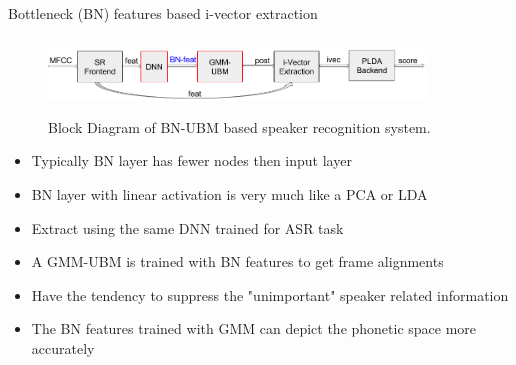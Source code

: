 \documentclass{beamer}
\begin{document}
\begin{frame}{Bottleneck (BN) features based i-vector extraction}
\begin{figure}
      \centering
      \includegraphics[width=10cm, height=2cm]{figures/BN_ivec_blockdiagram.png}
      \vspace{-4pt}
      \caption{Block Diagram of BN-UBM based speaker recognition system.}
      \label{fig:bn_ivec}
  \end{figure}
  \vspace{-15pt}
\begin{itemize}
    \item Typically BN layer has fewer nodes then input layer
    \item BN layer with linear activation is very much like a PCA or LDA
    \item Extract using the same DNN trained for ASR task
    \item A GMM-UBM is trained with BN features to get frame alignments
    \item Have the tendency to suppress the "unimportant" speaker related information
    \item The BN features trained with GMM can depict the phonetic space more accurately
\end{itemize}
\end{frame}
\end{document}
